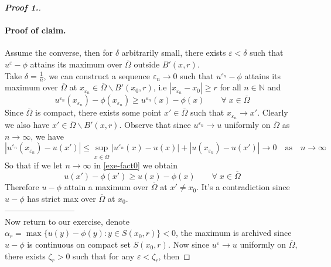 \documentclass[12pt, oneside]{amsart}  	%
\begin{document}
\begin{proof}[\textbf{Proof 1.}]
\paragraph{\textbf{Proof of claim.}} Assume the converse, then for $\delta$ arbitrarily small, there exists $\varepsilon<\delta$ such that $u^{\varepsilon} -\phi$ attains its maximum over $\overline{\Omega}$ outside $B'(x,r)$. \\
Take $\delta = \frac{1}{n}$, we can construct a sequence $\varepsilon_n \longrightarrow 0$ such that $u^{\varepsilon_n} - \phi$ attains its maximum over $\overline{\Omega}$ at $x_{\varepsilon_n} \in \overline{\Omega}\backslash B'(x_0,r)$, i.e $|x_{\varepsilon_n} - x_0| \geq r$ for all $n\in \mathbb{N}$ and
\begin{equation}\label{exe-fact0}
u^{\varepsilon_n}\left(x_{\varepsilon_n}\right) - \phi\left(x_{\varepsilon_n}\right) \geq  u^{\varepsilon_n}\left(x\right) - \phi\left(x\right) \qquad\forall\; x\in \overline{\Omega}
\end{equation}
Since $\overline{\Omega}$ is compact, there exists some point $x'\in \overline{\Omega}$ such that $x_{\varepsilon_n} \longrightarrow x'$. Clearly we also have $x'\in \overline{\Omega}\backslash B'(x,r)$. Observe that since $u^{\varepsilon_n}\longrightarrow u$ uniformly on $\overline{\Omega}$ as $n\longrightarrow\infty$, we have
\begin{equation*}
\left|u^{\varepsilon_n}\left(x_{\varepsilon_n}\right) - u(x') \right|\leq \sup_{x\in \overline{\Omega}} \left|u^{\varepsilon_n}(x) - u(x)\right| + \left|u\left(x_{\varepsilon_n}\right) - u(x')\right| \longrightarrow 0\quad\text{as}\quad n\longrightarrow\infty
\end{equation*}
So that if we let $n\longrightarrow\infty$ in \eqref{exe-fact0} we obtain
\begin{equation*}
u(x') - \phi(x')  \geq u(x) - \phi(x) \qquad\forall\;x\in \overline{\Omega}
\end{equation*}
Therefore $u-\phi$ attain a maximum over $\overline{\Omega}$ at $x'\neq x_0$. It's a contradiction since $u-\phi$ has strict max over $\overline{\Omega}$ at $x_0$. \\
--------------------------\\
Now return to our exercise, denote $\alpha_r = \max  \{u(y) - \phi(y): y\in S(x_0,r)\} < 0$, the maximum is archived since $u-\phi$ is continuous on compact set $S(x_0,r)$. Now since $u^\varepsilon \longrightarrow u$ uniformly on $\overline{\Omega}$, there exists $\zeta_r>0$ such that for any $\varepsilon < \zeta_r$, then

\end{proof}
\end{document}
